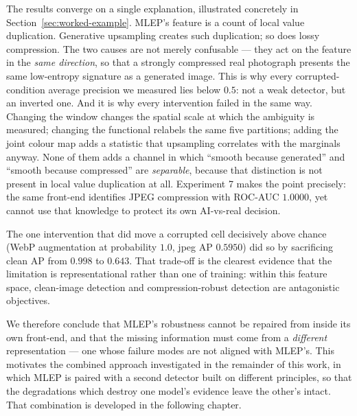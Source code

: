 The results converge on a single explanation, illustrated concretely in
Section~\ref{sec:worked-example}. MLEP's feature is a count of local value
duplication. Generative upsampling creates such duplication; so does lossy
compression. The two causes are not merely confusable --- they act on the
feature in the \emph{same direction}, so that a strongly compressed real
photograph presents the same low-entropy signature as a generated image. This is
why every corrupted-condition average precision we measured lies below $0.5$: not
a weak detector, but an inverted one. And it is why every intervention failed in
the same way. Changing the window changes the spatial scale at which the
ambiguity is measured; changing the functional relabels the same five
partitions; adding the joint colour map adds a statistic that upsampling
correlates with the marginals anyway. None of them adds a channel in which
``smooth because generated'' and ``smooth because compressed'' are
\emph{separable}, because that distinction is not present in local value
duplication at all. Experiment 7 makes the point precisely: the same front-end
identifies JPEG compression with ROC-AUC $1.0000$, yet cannot use that knowledge
to protect its own AI-vs-real decision.

The one intervention that did move a corrupted cell decisively above chance
(WebP augmentation at probability $1.0$, jpeg AP $0.5950$) did so by sacrificing
clean AP from $0.998$ to $0.643$. That trade-off is the clearest evidence that
the limitation is representational rather than one of training: within this
feature space, clean-image detection and compression-robust detection are
antagonistic objectives.

We therefore conclude that MLEP's robustness cannot be repaired from inside its
own front-end, and that the missing information must come from a
\emph{different} representation --- one whose failure modes are not aligned with
MLEP's. This motivates the combined approach investigated in the remainder of
this work, in which MLEP is paired with a second detector built on different
principles, so that the degradations which destroy one model's evidence leave
the other's intact. That combination is developed in the following chapter.

